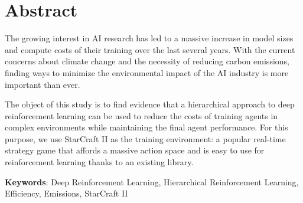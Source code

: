 \chapter*{Abstract}

The growing interest in AI research has led to a massive increase in model sizes and compute costs of their training over the last several years. With the current concerns about climate change and the necessity of reducing carbon emissions, finding ways to minimize the environmental impact of the AI industry is more important than ever.

The object of this study is to find evidence that a hierarchical approach to deep reinforcement learning can be used to reduce the costs of training agents in complex environments while maintaining the final agent performance. For this purpose, we use StarCraft II as the training environment: a popular real-time strategy game that affords a massive action space and is easy to use for reinforcement learning thanks to an existing library.

\vspace{1.5cm}

\textbf{Keywords}: Deep Reinforcement Learning, Hierarchical Reinforcement Learning, Efficiency, Emissions, StarCraft II
